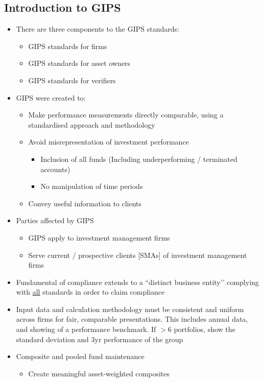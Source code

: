 \documentclass[../notes_compiled.tex]{subfiles}
\begin{document}
\subsection{Introduction to GIPS}
\begin{itemize}
\item There are three components to the GIPS standards:
\begin{itemize}
\item GIPS standards for firms
\item GIPS standards for asset owners
\item GIPS standards for verifiers
\end{itemize}
\item GIPS were created to:
\begin{itemize}
\item Make performance measurements directly comparable, using a standardised approach and methodology
\item Avoid misrepresentation of investment performance
\begin{itemize}
\item Inclusion of all funds (Including underperforming / terminated accounts)
\item No manipulation of time periods
\end{itemize}
\item Convey useful information to clients
\end{itemize}
\item Parties affected by GIPS
\begin{itemize}
\item GIPS apply to investment management firms
\item Serve current / prospective clients [SMAs] of investment management firms
\end{itemize}
\item Fundamental of compliance extends to a ``distinct business entity’’ complying with \underline{all} standards in order to claim compliance
\item Input data and calculation methodology must be consistent and uniform across firms for fair, comparable presentations. This includes annual data, and showing of a performance benchmark. If $>6$ portfolios, show the standard deviation and 3yr performance of the group
\item Composite and pooled fund maintenance
\begin{itemize}
\item Create meaningful asset-weighted composites

\end{itemize}
\end{itemize}
\end{document}
